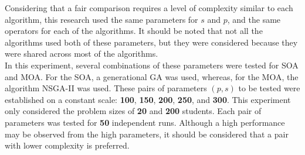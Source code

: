 Considering that a fair comparison requires a level of complexity similar to each algorithm, this research used the same parameters for $s$ and $p$, and the same operators for each of the algorithms. It should be noted that not all the algorithms used both of these parameters, but they were considered because they were shared across most of the algorithms.\\

In this experiment, several combinations of these parameters were tested for SOA and MOA. For the SOA, a generational GA was used, whereas, for the MOA, the algorithm NSGA-II was used. These pairs of parameters $(p,s)$ to be tested were established on a constant scale: \textbf{100}, \textbf{150}, \textbf{200}, \textbf{250}, and \textbf{300}. This experiment only considered the problem sizes of \textbf{20} and \textbf{200} students. Each pair of parameters was tested for \textbf{50} independent runs. Although a high performance may be observed from the high parameters, it should be considered that a pair with lower complexity is preferred.\\

\par
\begin{table}[H]
\centering
{}
\caption{The results of the parameters experiment of $n=20$ for SOA, by combinations of a population size $p$ and a number of steps or generations $s$.}
\label{table:parameters_(SOA)_20}
\end{table}

